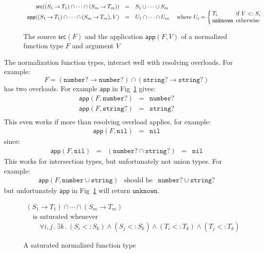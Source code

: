 \documentclass[acmsmall,review,screen]{acmart}
\newcommand{\UNKNOWN}{\mathtt{unknown}}
\newcommand{\NIL}{\mathtt{nil}}
\newcommand{\NUMBER}{\mathtt{number}}
\newcommand{\STRING}{\mathtt{string}}
\newcommand{\APP}{\mathsf{app}}
\newcommand{\SRC}{\mathsf{src}}
\newcommand{\fun}{\mathbin{\rightarrow}}
\newcommand{\st}{\mathbin.}
\begin{document}
\begin{figure}
  
\[\begin{array}{rcll}
  \SRC((S_1 \fun T_1) \cap\cdots\cap (S_m \fun T_m)) & = & S_1 \cup\cdots\cup S_m \\
  \APP((S_1 \fun T_1) \cap\cdots\cap (S_m \fun T_m), V) & = & U_1 \cap\cdots\cap U_m &
  \mbox{ where } U_i = \left\{ \begin{array}{@{\,}l@{\,}l}
    T_i & \mbox{ if } V <: S_i \\
    \UNKNOWN & \mbox{ otherwise }
  \end{array} \right.
\end{array}\]
\caption{The source $\SRC(F)$
  and the application $\APP(F, V)$ of a normalized function type $F$ and argument $V$}
\label{fig:ntypes}

\end{figure}
  
The normalization function types, interact well with resolving overloads. For example:
\[
  F = (\NUMBER? \fun \NUMBER?) \cap (\STRING? \fun \STRING?)
\]
has two overloads. For example $\APP$ in Fig~\ref{fig:ntypes} gives:
\[\begin{array}{rcl}
  \APP(F, \NUMBER?) & = & \NUMBER? \\
  \APP(F, \STRING?) & = & \STRING? \\
\end{array}\]
This even works if more than resolving overload applies, for example:
\[\begin{array}{rcl}
  \APP(F, \NIL) & = & \NIL
\end{array}\]
since:
\[\begin{array}{rcccl}
  \APP(F, \NIL) & = & (\NUMBER? \cap \STRING?) & = & \NIL
\end{array}\]
This works for intersection types, but unfortunately not union types. For example:
\[\begin{array}{rcl}
  \APP(F, \NUMBER \cup \STRING) & \mbox{should be} & \NUMBER? \cup\STRING?
\end{array}\]
but unfortunately $\APP$ in Fig~\ref{fig:ntypes} will return $\UNKNOWN$.

\begin{figure}
  
\[\begin{array}{l}
  (S_1 \fun T_1) \cap\cdots\cap (S_m \fun T_m) \\\quad
  \mbox{is saturated whenever} \\\qquad
  \forall i, j \st
    \exists k \st
      (S_i <: S_k) \land
      (S_j <: S_k) \land
      (T_i <: T_k) \land
      (T_j <: T_k)
\end{array}\]
\caption{A saturated normalized function type}
\label{fig:satutypes}

\end{figure}
\end{document}
